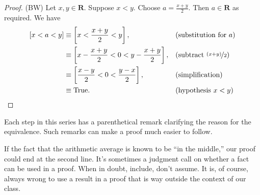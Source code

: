 \documentclass[12pt,fleqn,answers]{article}
\newcommand{\reals}{\mathbf{R}}
\newcommand{\true}{\mathrm{True}}
\newenvironment{myproof}
  {\begin{shaded}\begin{proof}}
  {\end{proof}\end{shaded}}
\begin{document}
\begin{myproof} (BW)
    Let $x,y \in \reals$. Suppose $x < y$. Choose $a = \frac{x+y}{2}$.
    Then $a \in \reals$ as required. We have
    \begin{align*}
      \left[ x < a < y \right] 
          &\equiv \left[ x < \frac{x+y}{2} < y \right], &&\text{(substitution for $a$)} \\
          & \equiv \left[ x - \frac{x+y}{2} < 0 < y - \frac{x+y}{2}  \right], &&\text{(subtract $\nicefrac{(x+y)}{2}$)} \\
          & \equiv \left[ \frac{x-y}{2} < 0 < \frac{y-x}{2}  \right], &&\text{(simplification)} \\
          & \equiv \true. && \text{(hypothesis $x < y$)} \qedhere
    \end{align*} 
\end{myproof}
\noindent Each step in this series has a parenthetical remark clarifying the reason for the equivalence. 
Such remarks can make a proof much easier to follow. 

If the fact that the arithmetic average is known to be ``in the middle,'' our proof could end at 
the second line. It's sometimes a judgment call on whether a fact can be used in a proof. When in doubt, include, don't assume.
It is, of course, always wrong to use a result in a proof  that is way outside the context of our class.
\end{document}
